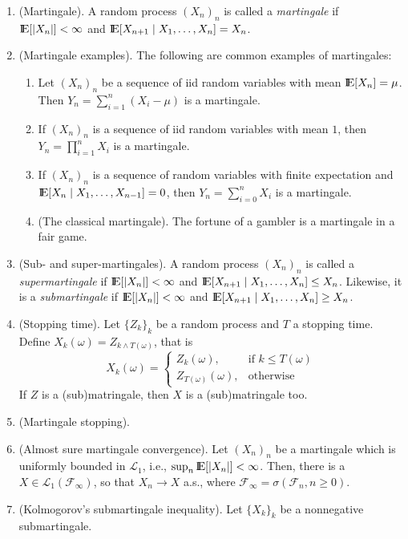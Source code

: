 \documentclass[a4paper,10pt]{article}
\begin{document}
\begin{enumerate}
 \item (Martingale). A random process $(X_n)_n$ is called a \textit{martingale} if 
		     $\E[|X_n|]<\infty$ and $\E[X_{n+1}{}\mid{}X_1,\ldots, X_n]=X_{n}$.
 \item (Martingale examples). The following are common examples of martingales:
  \begin{enumerate}
   \item Let $(X_n)_n$ be a sequence of iid random variables with mean $\E[X_n]=\mu$. Then
         $Y_n = \sum_{i=1}^{n}(X_i-\mu)$ is a martingale.
   \item If $(X_n)_n$ is a sequence of iid random variables with mean $1$, then 
         $Y_n = \prod_{i=1}^{n}X_i$ is a martingale.
   \item If $(X_n)_n$ is a sequence of random variables with finite expectation and 
         $\E[X_n{}\mid{}X_1,\ldots,X_{n-1}]=0$, then $Y_n=\sum_{i=0}^{n}X_i$ is a 
         martingale.
   \item (The classical martingale). The fortune of a gambler is a martingale in a fair game.
  \end{enumerate}
 \item (Sub- and super-martingales). A random process $(X_n)_n$ is called a \textit{supermartingale} if 
		     $\E[|X_n|]<\infty$ and $\E[X_{n+1}{}\mid{}X_1,\ldots, X_n]\leq X_{n}$. Likewise, it 
		     is a \textit{submartingale} if $\E[|X_n|]<\infty$ and $\E[X_{n+1}{}\mid{}X_1,\ldots, X_n]\geq X_{n}$.
 \item (Stopping time). Let $\{Z_k\}_k$ be a random process and $T$ a stopping time. 
       Define $X_k(\omega) = Z_{k\wedge T(\omega)}$, that is
       \[
        X_k(\omega) = \begin{cases}
                       Z_k(\omega),&\text{if }k \leq T(\omega)\\
                       Z_{T(\omega)}(\omega),&\text{otherwise}
                      \end{cases}
       \]
       If $Z$ is a (sub)matringale, then $X$ is a (sub)matringale too.
 \item (Martingale stopping).
 \item (Almost sure martingale convergence). Let $(X_n)_n$ be a martingale which is uniformly 
       bounded in $\mathcal{L}_1$, i.e., $\sup_n \E[|X_n|] < \infty$. Then, there is a $X\in\mathcal{L}_1(\mathcal{F}_\infty)$,
       so that $X_n\to X$ a.s., where $\mathcal{F}_\infty = \sigma(\mathcal{F}_n, n\geq 0)$.
 \item (Kolmogorov's submartingale inequality). Let $\{X_k\}_k$ be a nonnegative submartingale.

\end{enumerate}
\end{document}
